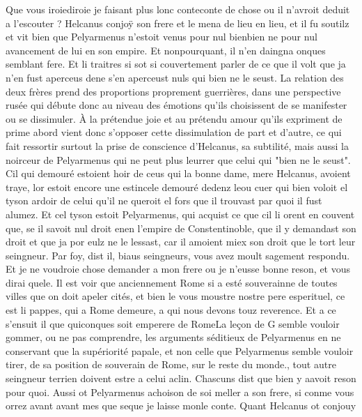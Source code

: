 \documentclass{article}
\begin{document}
\begin{pages}
   Que vous iroiediroie je 
      faisant plus lonc conteconte de chose ou il
         n'avroit deduit a l'escouter ? 
   Helcanus conjoÿ son frere et le mena de lieu en lieu, 
   et il fu soutilz et vit bien que Pelyarmenus n’estoit venus pour nul 
   bienbien ne pour nul avancement de lui en son empire. 
   Et nonpourquant, il n’en daingna onques semblant fere. Et li traitres si sot 
   si couvertement parler de ce que il volt que ja 
   n’en fust aperceus dene s'en aperceust nuls qui bien ne le seust.
La relation des deux frères prend des proportions proprement guerrières, dans une perspective rusée qui 
débute donc au niveau des émotions qu'ils choisissent de se manifester ou se dissimuler. À la prétendue joie et au prétendu amour 
qu'ils expriment de prime abord vient donc s'opposer cette dissimulation de part et d'autre, ce qui fait ressortir surtout la prise 
de conscience d'Helcanus, sa subtilité, mais aussi la noirceur de Pelyarmenus qui ne peut plus leurrer que celui qui
"bien ne le seust". \pend
\pstart Cil qui demouré estoient hoir de ceus qui 
   la bonne dame, mere Helcanus, avoient traye, 
   lor estoit encore une estincele demouré dedenz leou cuer qui bien voloit 
   el tyson ardoir de celui qu’il ne queroit el fors que il trouvast par quoi il fust alumez. Et cel tyson estoit 
   Pelyarmenus, qui acquist ce que cil li orent en couvent que, se il savoit nul droit 
   enen l'empire de Constentinoble, 
   que il y demandast son droit et que ja por eulz ne le lessast, car il amoient miex son droit que le tort 
   leur seingneur.
   Par foy, dist il, biaus seingneurs, vous 
      avez moult sagement respondu. 
   Et je ne voudroie chose demander a mon frere ou je n’eusse bonne reson, 
   et vous dirai quele. Il est voir que anciennement Rome si a esté souverainne de toutes villes 
   que on doit apeler cités, et bien le vous moustre nostre pere esperituel, ce est li pappes, 
   qui a Rome demeure, a qui nous devons touz reverence. Et a ce s’ensuit 
      il que quiconques soit emperere de 
      RomeLa leçon de G semble 
      vouloir gommer, ou ne pas comprendre, les arguments séditieux de Pelyarmenus en ne conservant que la supériorité papale, 
      et non celle que Pelyarmenus semble vouloir tirer, de sa position de souverain de Rome, sur le reste du monde., 
      tout autre seingneur terrien doivent estre a celui aclin.
   Chascuns dist que bien y aavoit 
      reson pour quoi. Aussi ot 
   Pelyarmenus achoison de soi meller a son frere, 
   si conme vous orrez avant
      avant mes 
      que seque je laisse 
      monle conte. \pend
\pstart Quant Helcanus ot conjouy 

\end{pages}
\end{document}
